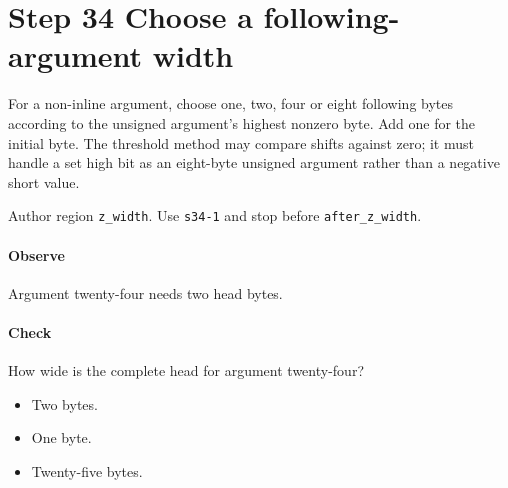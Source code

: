 \section{Step 34 Choose a following-argument width}\label{cbor-s34}
For a non-inline argument, choose one, two, four or eight following bytes according to the unsigned argument's highest nonzero byte. Add one for the initial byte. The threshold method may compare shifts against zero; it must handle a set high bit as an eight-byte unsigned argument rather than a negative short value.

Author region \texttt{z\_width}. Use \texttt{s34-1} and stop before \texttt{after\_z\_width}.

\paragraph{Observe} Argument twenty-four needs two head bytes.

\paragraph{Check} How wide is the complete head for argument twenty-four?
\begin{itemize}
  \item[A.] Two bytes.
  \item[B.] One byte.
  \item[C.] Twenty-five bytes.
\end{itemize}
